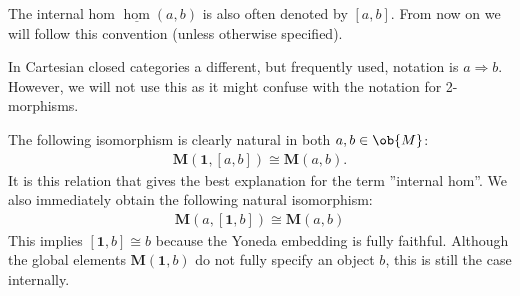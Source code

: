     \begin{notation}
        The internal hom $\underline{\hom}(a,b)$ is also often denoted by $[a,b]$. From now on we will follow this convention (unless otherwise specified).
    \end{notation}

    \begin{notation}
        In Cartesian closed categories a different, but frequently used, notation is $a\Rightarrow b$. However, we will not use this as it might confuse with the notation for 2-morphisms.
    \end{notation}
    \begin{property}\label{cat:internal_hom_property}
        The following isomorphism is clearly natural in both $a,b\in\ob{M}$:
        \begin{gather}
            \mathbf{M}(\mathbf{1}, [a,b])\cong\mathbf{M}(a, b).
        \end{gather}
        It is this relation that gives the best explanation for the term ''internal hom''. We also immediately obtain the following natural isomorphism:
        \begin{gather}
            \mathbf{M}(a, [\mathbf{1}, b])\cong\mathbf{M}(a, b)
        \end{gather}
        This implies $[\mathbf{1}, b]\cong b$ because the Yoneda embedding is fully faithful. Although the global elements $\mathbf{M}(\mathbf{1}, b)$ do not fully specify an object $b$, this is still the case internally.
    \end{property}

